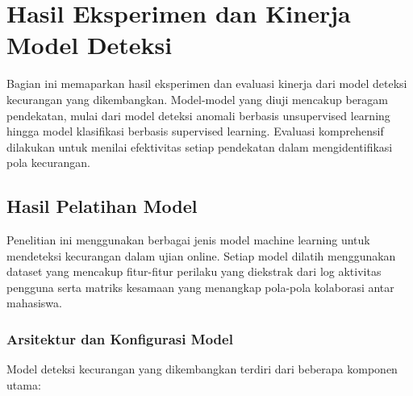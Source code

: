 
\section{Hasil Eksperimen dan Kinerja Model Deteksi}
\label{sec:hasilEksperimen}

Bagian ini memaparkan hasil eksperimen dan evaluasi kinerja dari model deteksi kecurangan yang dikembangkan. Model-model yang diuji mencakup beragam pendekatan, mulai dari model deteksi anomali berbasis unsupervised learning hingga model klasifikasi berbasis supervised learning. Evaluasi komprehensif dilakukan untuk menilai efektivitas setiap pendekatan dalam mengidentifikasi pola kecurangan.

\subsection{Hasil Pelatihan Model}
\label{subsec:hasilPelatihanModel}

Penelitian ini menggunakan berbagai jenis model machine learning untuk mendeteksi kecurangan dalam ujian online. Setiap model dilatih menggunakan dataset yang mencakup fitur-fitur perilaku yang diekstrak dari log aktivitas pengguna serta matriks kesamaan yang menangkap pola-pola kolaborasi antar mahasiswa.

\subsubsection{Arsitektur dan Konfigurasi Model}

Model deteksi kecurangan yang dikembangkan terdiri dari beberapa komponen utama:

